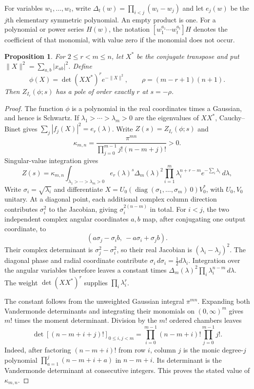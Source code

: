 \documentclass[11pt,a4paper]{article}
\numberwithin{equation}{section}
\newtheorem{proposition}[theorem]{Proposition}
\theoremstyle{definition}
\begin{document}
For variables $w_1,\ldots,w_t$, write
$\Delta_t(w)=\prod_{i<j}(w_i-w_j)$ and let $e_j(w)$ be the $j$th
elementary symmetric polynomial. An empty product is one. For a
polynomial or power series $H(w)$, the notation
$[w_1^{a_1}\cdots w_t^{a_t}]H$ denotes the coefficient of that
monomial, with value zero if the monomial does not occur.

\begin{proposition}\label{prop:integerpole}
For $2\le r<m\le n$, let $X^*$ be the conjugate transpose and put
$\|X\|^2=\sum_{a,b}|x_{ab}|^2$. Define
\[
\phi(X)=\det(XX^*)^r e^{-\|X\|^2},\qquad
\rho=(m-r+1)(n+1).
\]
Then $Z_{I_r}(\phi;s)$ has a pole
of order exactly $r$ at $s=-\rho$.
\end{proposition}
\begin{proof}
The function $\phi$ is a polynomial in the real coordinates times a
Gaussian, and hence is Schwartz. If
$\lambda_1>\cdots>\lambda_m>0$ are the eigenvalues of $XX^*$,
Cauchy--Binet gives $\sum_j|f_j(X)|^2=e_r(\lambda)$.
Write $Z(s)=Z_{I_r}(\phi;s)$ and
\[
\kappa_{m,n}=\frac{\pi^{mn}}{\prod_{j=0}^{m-1}j!(n-m+j)!}>0.
\]
Singular-value integration gives
\begin{equation}\label{eq:svd}
Z(s)=\kappa_{m,n}
\int_{\lambda_1>\cdots>\lambda_m>0}
e_r(\lambda)^s\Delta_m(\lambda)^2
\prod_{i=1}^m\lambda_i^{n+r-m}e^{-\sum_i\lambda_i}\,d\lambda,
\end{equation}
Write $\sigma_i=\sqrt{\lambda_i}$ and differentiate
$X=U_0(\operatorname{diag}(\sigma_1,\ldots,\sigma_m)\ 0)V_0^*$, with
$U_0,V_0$ unitary. At a diagonal point, each additional complex column
direction contributes $\sigma_i^2$ to the Jacobian, giving
$\sigma_i^{2(n-m)}$ in total. For $i<j$, the two independent
complex angular coordinates $a,b$ map, after conjugating one output
coordinate, to
\[
(a\sigma_j-\sigma_i b,\ -a\sigma_i+\sigma_j b).
\]
Their complex determinant is $\sigma_j^2-\sigma_i^2$, so their real
Jacobian is $(\lambda_i-\lambda_j)^2$. The diagonal phase and
radial coordinate contribute $\sigma_i\,d\sigma_i
=\tfrac12d\lambda_i$. Integration over the angular variables
therefore leaves a constant times
$\Delta_m(\lambda)^2\prod_i\lambda_i^{n-m}\,d\lambda$.
The weight $\det(XX^*)^r$ supplies $\prod_i\lambda_i^r$.

The constant follows from the unweighted Gaussian integral
$\pi^{mn}$. Expanding both Vandermonde determinants and integrating
their monomials on $(0,\infty)^m$ gives $m!$ times the moment
determinant. Division by the $m!$ ordered chambers leaves
\[
\det[(n-m+i+j)!]_{0\le i,j<m}
=\prod_{i=0}^{m-1}(n-m+i)!\prod_{j=0}^{m-1}j!.
\]
Indeed, after factoring $(n-m+i)!$ from row $i$, column $j$
is the monic degree-$j$ polynomial
$\prod_{a=1}^j(n-m+i+a)$ in $n-m+i$. Its determinant is the
Vandermonde determinant at consecutive integers. This proves the
stated value of $\kappa_{m,n}$.


\end{proof}
\end{document}
